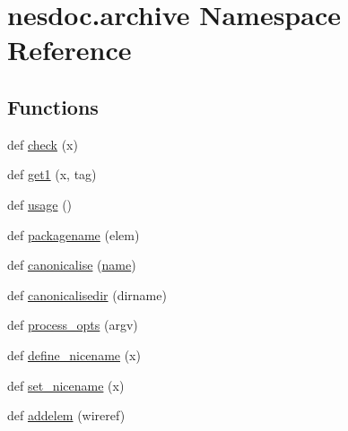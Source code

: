\hypertarget{namespacenesdoc_1_1archive}{}\section{nesdoc.\+archive Namespace Reference}
\label{namespacenesdoc_1_1archive}
\subsection*{Functions}
\begin{DoxyCompactItemize}
\item 
def \hyperlink{namespacenesdoc_1_1archive_af1b15cd440888891d269cf4de8abefb9}{check} (x)
\item 
def \hyperlink{namespacenesdoc_1_1archive_a0e1ef9fd5092eb3e085b0a8024c835a7}{get1} (x, tag)
\item 
def \hyperlink{namespacenesdoc_1_1archive_a06a492b5c44ac9300c9dff8bb9b0064b}{usage} ()
\item 
def \hyperlink{namespacenesdoc_1_1archive_aa795e265f9f6996880918c2e09e965c8}{packagename} (elem)
\item 
def \hyperlink{namespacenesdoc_1_1archive_a360ab7bbb9a29a90365cd2af7b32ea4e}{canonicalise} (\hyperlink{namespacenesdoc_1_1archive_ac1e3ca5ea254f2d542c19d1fd474e6d5}{name})
\item 
def \hyperlink{namespacenesdoc_1_1archive_ad96cc44126bbdebb5003546e7d676e1d}{canonicalisedir} (dirname)
\item 
def \hyperlink{namespacenesdoc_1_1archive_a01d74930ad9f3b40230adeb25277368f}{process\+\_\+opts} (argv)
\item 
def \hyperlink{namespacenesdoc_1_1archive_a957ed3f94bca61f84da73e9563993318}{define\+\_\+nicename} (x)
\item 
def \hyperlink{namespacenesdoc_1_1archive_a3f536a19e0523bcb3b2cfa45f00979da}{set\+\_\+nicename} (x)
\item 
def \hyperlink{namespacenesdoc_1_1archive_a8f82841b56ca16d412da9c9871f94d12}{addelem} (wireref)
\end{DoxyCompactItemize}
